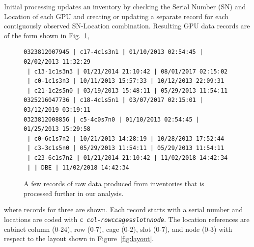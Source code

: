Initial processing updates an inventory by checking the Serial Number
(SN) and Location of each GPU and creating or updating a separate
record for each contiguously observed SN-Location
combination. Resulting GPU data records are of the form shown in
Fig.~\ref{fig:dataraw},
\begin{figure}[tb]
{\notsotiny\bf
\begin{verbatim}
0323812007945 | c17-4c1s3n1 | 01/10/2013 02:54:45 | 02/02/2013 11:32:29
 | c13-1c1s3n3 | 01/21/2014 21:10:42 | 08/01/2017 02:15:02
 | c0-1c1s3n3 | 10/11/2013 15:57:33 | 10/12/2013 22:09:31
 | c21-1c2s5n0 | 03/19/2013 15:48:11 | 05/29/2013 11:54:11
0325216047736 | c18-4c1s5n1 | 03/07/2017 02:15:01 | 03/12/2019 03:19:11
0323812008856 | c5-4c0s7n0 | 01/10/2013 02:54:45 | 01/25/2013 15:29:58
 | c0-6c1s7n2 | 10/21/2013 14:28:19 | 10/28/2013 17:52:44
 | c3-3c1s5n0 | 05/29/2013 11:54:11 | 05/29/2013 11:54:11
 | c23-6c1s7n2 | 01/21/2014 21:10:42 | 11/02/2018 14:42:34
 | | DBE | 11/02/2018 14:42:34
\end{verbatim}
}
\caption{A few records of raw data produced from inventories that is
  processed further in our analysis.}
\label{fig:dataraw}
\end{figure}
where records for three are shown. Each record starts
with a serial number and locations are coded with {\tt c{\it
    col-row}c{\it cage}s{\it slot}n{\it node}}. The location
references are cabinet column (0-24), row (0-7), cage (0-2), slot
(0-7), and node (0-3) with respect to the layout shown in
Figure~\ref{fig:layout}.
